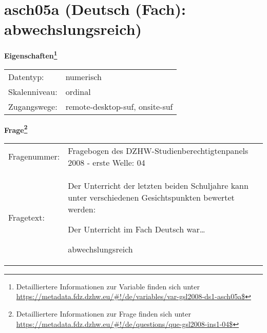 
    \setcounter{footnote}{0}

    \vspace*{-1.8cm}
	\section{asch05a (Deutsch (Fach): abwechslungsreich)}
	\label{section:asch05a}



    \vspace*{0.5cm}
    \noindent\textbf{Eigenschaften\footnote{Detailliertere Informationen zur Variable finden sich unter
		\url{https://metadata.fdz.dzhw.eu/\#!/de/variables/var-gsl2008-ds1-asch05a$}}}\\
	\begin{tabularx}{\hsize}{@{}lX}
	Datentyp: & numerisch \\
	Skalenniveau: & ordinal \\
	Zugangswege: &
	  remote-desktop-suf, 
	  onsite-suf
 \\
    \end{tabularx}



				\vspace*{0.5cm}
                \noindent\textbf{Frage\footnote{Detailliertere Informationen zur Frage finden sich unter
		              \url{https://metadata.fdz.dzhw.eu/\#!/de/questions/que-gsl2008-ins1-04$}}}\\
				\begin{tabularx}{\hsize}{@{}lX}
					Fragenummer: &
					  Fragebogen des DZHW-Studienberechtigtenpanels 2008 - erste Welle:
					  04
 \\
					Fragetext: & Der Unterricht der letzten beiden Schuljahre kann unter verschiedenen Gesichtspunkten bewertet werden:\par  Der Unterricht im Fach Deutsch war…\par  abwechslungsreich \\
				\end{tabularx}





